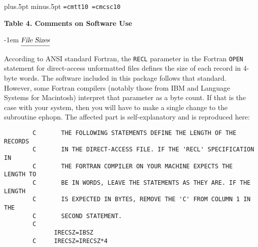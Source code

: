 
\parindent=0pt\parskip=8pt
 plus.5pt minus.5pt
\lineskiplimit=1pt\lineskip=1pt
\font\tt=cmtt10
\font\csc=cmcsc10
\newcount\inum
\def\vp{\vskip\parskip}
\def\pf{\par\filbreak}
\def\el{\hfill\break}
\def\itm#1{\leavevmode\hangindent.75truein\hangafter=1
\advance\inum by 1
\hbox to2em{\rm\hfil\number\inum. }#1\vadjust{\kern5pt}\el}
\def\ul#1{$\underline{\hbox{\sl\strut#1}}$}
\def\hdg#1{\vskip4pt\leavevmode\kern-1em \ul{#1}\par}
\centerline{\bf Table 4. Comments on Software Use}
\vskip8pt
\hdg{File Sizes}
According to ANSI standard Fortran, the {\tt RECL} parameter in the
Fortran {\tt OPEN} statement for direct-access
unformatted files defines the size of each record in 4-byte words.
The software included in this package follows that standard.
However, some Fortran compilers (notably those from IBM
and Language Systems for Macintosh) interpret that parameter as a
byte count. If that is the case with your system, then you will have
to make a single change to the subroutine {\csc ephopn}.
The affected part is self-explanatory and is reproduced here:
\begin{verbatim}
        C       THE FOLLOWING STATEMENTS DEFINE THE LENGTH OF THE RECORDS
        C       IN THE DIRECT-ACCESS FILE. IF THE 'RECL' SPECIFICATION IN
        C       THE FORTRAN COMPILER ON YOUR MACHINE EXPECTS THE LENGTH TO
        C       BE IN WORDS, LEAVE THE STATEMENTS AS THEY ARE. IF THE LENGTH
        C       IS EXPECTED IN BYTES, REMOVE THE 'C' FROM COLUMN 1 IN THE
        C       SECOND STATEMENT.
        C
              IRECSZ=IBSZ
        C     IRECSZ=IRECSZ*4
\end{verbatim}
